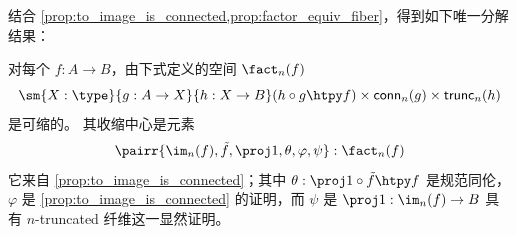 
结合 \cref{prop:to_image_is_connected,prop:factor_equiv_fiber}，得到如下唯一分解结果：

\begin{thm}\label{thm:orth-fact}
对每个 $f:A\to B$，由下式定义的空间 $\fact_n(f)$
\begin{equation*}
\sm{X:\type}{g:A\to X}{h:X\to B} (h\circ g\htpy f)\times\mathsf{conn}_n(g)\times\mathsf{trunc}_n(h)
\end{equation*}
是可缩的。
其收缩中心是元素
\begin{equation*}
\pairr{\im_n(f),\tilde{f},\proj1,\theta,\varphi,\psi}:\fact_n(f)
\end{equation*}
它来自 \cref{prop:to_image_is_connected}；其中 $\theta:\proj1\circ\tilde{f}\htpy f$ 是规范同伦，$\varphi$ 是
\cref{prop:to_image_is_connected} 的证明，而 $\psi$ 是 $\proj1:\im_n(f)\to B$ 具有 $n$-truncated 纤维这一显然证明。
\end{thm}

